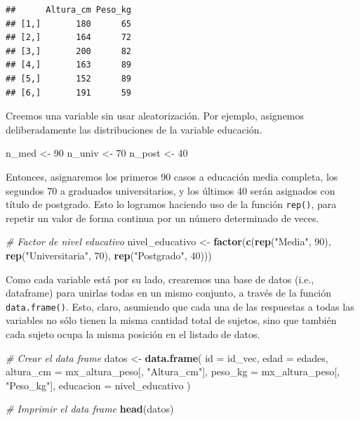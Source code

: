 \documentclass[
]{book}
\newenvironment{Shaded}{\begin{snugshade}}{\end{snugshade}}
\newcommand{\AttributeTok}[1]{\textcolor[rgb]{0.13,0.29,0.53}{#1}}
\newcommand{\CommentTok}[1]{\textcolor[rgb]{0.56,0.35,0.01}{\textit{#1}}}
\newcommand{\DecValTok}[1]{\textcolor[rgb]{0.00,0.00,0.81}{#1}}
\newcommand{\FunctionTok}[1]{\textcolor[rgb]{0.13,0.29,0.53}{\textbf{#1}}}
\newcommand{\NormalTok}[1]{#1}
\newcommand{\OtherTok}[1]{\textcolor[rgb]{0.56,0.35,0.01}{#1}}
\newcommand{\StringTok}[1]{\textcolor[rgb]{0.31,0.60,0.02}{#1}}
\begin{document}
\begin{verbatim}
##      Altura_cm Peso_kg
## [1,]       180      65
## [2,]       164      72
## [3,]       200      82
## [4,]       163      89
## [5,]       152      89
## [6,]       191      59
\end{verbatim}

Creemos una variable sin usar aleatorización. Por ejemplo, asignemos deliberadamente las distribuciones de la variable educación.

\begin{Shaded}
\begin{Highlighting}[]
\NormalTok{n\_med  }\OtherTok{\textless{}{-}} \DecValTok{90}
\NormalTok{n\_univ }\OtherTok{\textless{}{-}} \DecValTok{70}
\NormalTok{n\_post }\OtherTok{\textless{}{-}} \DecValTok{40}
\end{Highlighting}
\end{Shaded}

Entonces, asignaremos los primeros 90 casos a educación media completa, los segundos 70 a graduados universitarios, y los últimos 40 serán asignados con título de postgrado. Esto lo logramos haciendo uso de la función \texttt{rep()}, para repetir un valor de forma continua por un número determinado de veces.

\begin{Shaded}
\begin{Highlighting}[]
\CommentTok{\# Factor de nivel educativo}
\NormalTok{nivel\_educativo }\OtherTok{\textless{}{-}} \FunctionTok{factor}\NormalTok{(}\FunctionTok{c}\NormalTok{(}\FunctionTok{rep}\NormalTok{(}\StringTok{"Media"}\NormalTok{, }\DecValTok{90}\NormalTok{), }\FunctionTok{rep}\NormalTok{(}\StringTok{"Universitaria"}\NormalTok{, }\DecValTok{70}\NormalTok{), }\FunctionTok{rep}\NormalTok{(}\StringTok{"Postgrado"}\NormalTok{, }\DecValTok{40}\NormalTok{)))}
\end{Highlighting}
\end{Shaded}

Como cada variable está por su lado, crearemos una base de datos (i.e., dataframe) para unirlas todas en un mismo conjunto, a través de la función \texttt{data.frame()}. Esto, claro, asumiendo que cada una de las respuestas a todas las variables no sólo tienen la misma cantidad total de sujetos, sino que también cada sujeto ocupa la misma posición en el listado de datos.

\begin{Shaded}
\begin{Highlighting}[]
\CommentTok{\# Crear el data frame}
\NormalTok{datos }\OtherTok{\textless{}{-}} \FunctionTok{data.frame}\NormalTok{(}
         \AttributeTok{id =}\NormalTok{ id\_vec,}
         \AttributeTok{edad =}\NormalTok{ edades,}
         \AttributeTok{altura\_cm =}\NormalTok{ mx\_altura\_peso[, }\StringTok{"Altura\_cm"}\NormalTok{],}
         \AttributeTok{peso\_kg =}\NormalTok{ mx\_altura\_peso[, }\StringTok{"Peso\_kg"}\NormalTok{],}
         \AttributeTok{educacion =}\NormalTok{ nivel\_educativo}
\NormalTok{)}

\CommentTok{\# Imprimir el data frame}
\FunctionTok{head}\NormalTok{(datos)}
\end{Highlighting}
\end{Shaded}
\end{document}
